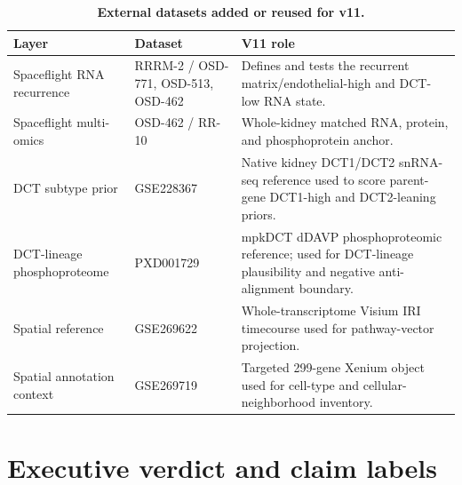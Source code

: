 \documentclass[10pt]{article}
\begin{document}
\begin{table}[H]
\centering\small
\caption{\textbf{External datasets added or reused for v11.}}
\label{tab:datasets}
\begin{tabularx}{\textwidth}{p{}p{}X}
\toprule
Layer & Dataset & V11 role \\
\midrule
Spaceflight RNA recurrence & RRRM-2 / OSD-771, OSD-513, OSD-462 & Defines and tests the recurrent matrix/endothelial-high and DCT-low RNA state. \\
Spaceflight multi-omics & OSD-462 / RR-10 & Whole-kidney matched RNA, protein, and phosphoprotein anchor. \\
DCT subtype prior & GSE228367 & Native kidney DCT1/DCT2 snRNA-seq reference used to score parent-gene DCT1-high and DCT2-leaning priors. \\
DCT-lineage phosphoproteome & PXD001729 & mpkDCT dDAVP phosphoproteomic reference; used for DCT-lineage plausibility and negative anti-alignment boundary. \\
Spatial reference & GSE269622 & Whole-transcriptome Visium IRI timecourse used for pathway-vector projection. \\
Spatial annotation context & GSE269719 & Targeted 299-gene Xenium object used for cell-type and cellular-neighborhood inventory. \\
\bottomrule
\end{tabularx}
\end{table}

\section{Executive verdict and claim labels}
\end{document}
